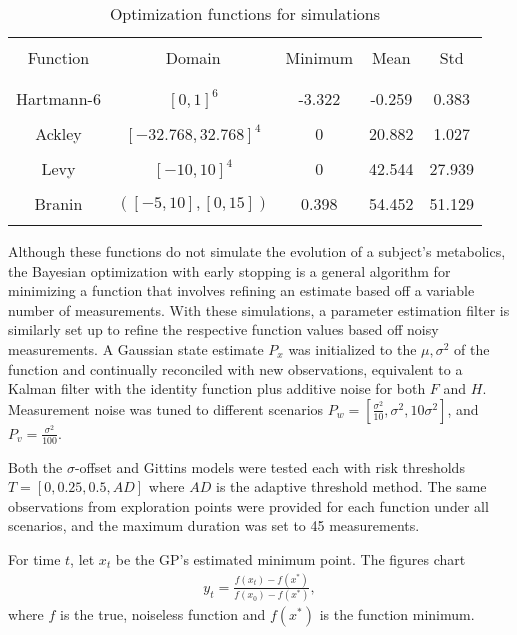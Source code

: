 \begin{table}[t]
\centering
\begin{tabular}{ |c | c | c | c | c | }
  \hline&&&&\\
  Function & Domain & Minimum & Mean & Std\\
  &&&&\\
  \hline
  &&&&\\
  Hartmann-6 & $[0,1]^6$ & -3.322 & -0.259 & 0.383\\
  &&&&\\
  Ackley & $[-32.768, 32.768]^4$ & 0 & 20.882 & 1.027\\
  &&&&\\
  Levy & $[-10, 10]^4$ & 0 & 42.544 & 27.939\\
  &&&&\\
  Branin & $([-5, 10],[0, 15])$ & 0.398 & 54.452 & 51.129\\
  &&&&\\
  \hline
\end{tabular}
\caption{Optimization functions for simulations}
\label{tab:optfunc}
\end{table}

Although these functions do not simulate the evolution of a subject's metabolics, the Bayesian optimization with early stopping is a general algorithm for minimizing a function that involves refining an estimate based off a variable number of measurements. With these simulations, a parameter estimation filter is similarly set up to refine the respective function values based off noisy measurements. A Gaussian state estimate $P_x$ was initialized to the $\mu, \sigma^2$ of the function and continually reconciled with new observations, equivalent to a Kalman filter with the identity function plus additive noise for both $F$ and $H$. Measurement noise was tuned to different scenarios $P_w=[\frac{\sigma^2}{10}, \sigma^2, 10\sigma^2]$, and $P_v=\frac{\sigma^2}{100}$. 

Both the $\sigma$-offset and Gittins models were tested each with risk thresholds $T=[0, 0.25, 0.5, AD]$ where $AD$ is the adaptive threshold method. The same observations from exploration points were provided for each function under all scenarios, and the maximum duration was set to 45 measurements.

For time $t$, let $x_t$ be the GP's estimated minimum point. The figures chart
\begin{align}
  y_t = \frac{f(x_t) - f(x^*)}{f(x_0) - f(x^*)},
\end{align}
where $f$ is the true, noiseless function and $f(x^*)$ is the function minimum.

